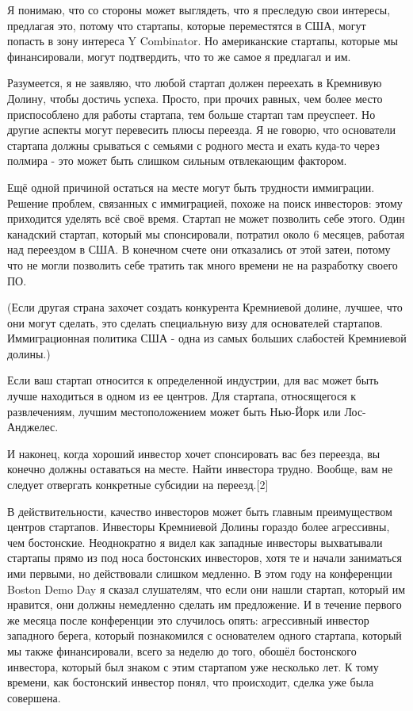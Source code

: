 \documentclass[ebook,12pt,oneside,openany]{memoir}
\begin{document}
Я понимаю, что со стороны может выглядеть, что я преследую свои
интересы, предлагая это, потому что стартапы, которые переместятся в
США, могут попасть в зону интереса Y Combinator. Но американские
стартапы, которые мы финансировали, могут подтвердить, что то же самое
я предлагал и им.

Разумеется, я не заявляю, что любой стартап должен переехать в
Кремнивую Долину, чтобы достичь успеха. Просто, при прочих равных, чем
более место приспособлено для работы стартапа, тем больше стартап там
преуспеет. Но другие аспекты могут перевесить плюсы переезда. Я не
говорю, что основатели стартапа должны срываться с семьями с родного
места и ехать куда-то через полмира - это может быть слишком сильным
отвлекающим фактором.

Ещё одной причиной остаться на месте могут быть трудности иммиграции.
Решение проблем, связанных с иммиграцией, похоже на поиск инвесторов:
этому приходится уделять всё своё время. Стартап не может позволить
себе этого. Один канадский стартап, который мы спонсировали, потратил
около 6 месяцев, работая над переездом в США. В конечном счете они
отказались от этой затеи, потому что не могли позволить себе тратить
так много времени не на разработку своего ПО.

(Если другая страна захочет создать конкурента Кремниевой долине,
лучшее, что они могут сделать, это сделать специальную визу для
основателей стартапов. Иммиграционная политика США - одна из самых
больших слабостей Кремниевой долины.)

Если ваш стартап относится к определенной индустрии, для вас может
быть лучше находиться в одном из ее центров. Для стартапа,
относящегося к развлечениям, лучшим местоположением может быть
Нью-Йорк или Лос-Анджелес.

И наконец, когда хороший инвестор хочет спонсировать вас без переезда,
вы конечно должны оставаться на месте. Найти инвестора трудно. Вообще,
вам не следует отвергать конкретные субсидии на переезд.[2]

В действительности, качество инвесторов может быть главным
преимуществом центров стартапов. Инвесторы Кремниевой Долины гораздо
более агрессивны, чем бостонские. Неоднократно я видел как западные
инвесторы выхватывали стартапы прямо из под носа бостонских
инвесторов, хотя те и начали заниматься ими первыми, но действовали
слишком медленно. В этом году на конференции Boston Demo Day я сказал
слушателям, что если они нашли стартап, который им нравится, они
должны немедленно сделать им предложение. И в течение первого же
месяца после конференции это случилось опять: агрессивный инвестор
западного берега, который познакомился с основателем одного стартапа,
который мы также финансировали, всего за неделю до того, обошёл
бостонского инвестора, который был знаком с этим стартапом уже
несколько лет. К тому времени, как бостонский инвестор понял, что
происходит, сделка уже была совершена.
\end{document}
